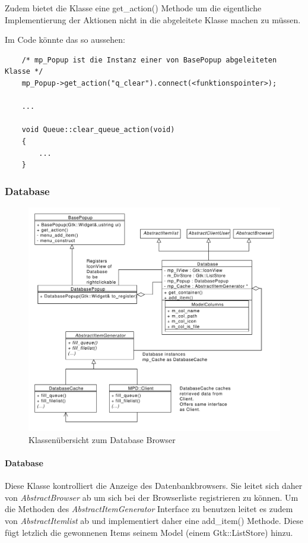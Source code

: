 Zudem bietet die Klasse eine get\_action() Methode um die eigentliche Implementierung der Aktionen nicht in die abgeleitete Klasse machen zu müssen. 

Im Code könnte das so aussehen:
\begin{verbatim}
    /* mp_Popup ist die Instanz einer von BasePopup abgeleiteten Klasse */
    mp_Popup->get_action("q_clear").connect(<funktionspointer>);

    ...

    void Queue::clear_queue_action(void)
    {
        ...
    }
\end{verbatim}


\subsubsection{Database}
\begin{figure}[htb!]
	\centering
        \includegraphics[width=\textwidth]{DatabaseClass.pdf}
	\caption{Klassenübersicht zum Database Browser}
	\label{st_database}
\end{figure}
\paragraph{Database}
Diese Klasse kontrolliert die Anzeige des Datenbankbrowsers. Sie leitet sich daher von \emph{AbstractBrowser} ab um sich bei der Browserliste registrieren zu können.
Um die Methoden des \emph{AbstractItemGenerator} Interface zu benutzen leitet es zudem von \emph{AbstractItemlist} ab und implementiert daher eine add\_item() Methode. 
Diese fügt letzlich die gewonnenen Items seinem Model (einem Gtk::ListStore) hinzu.

